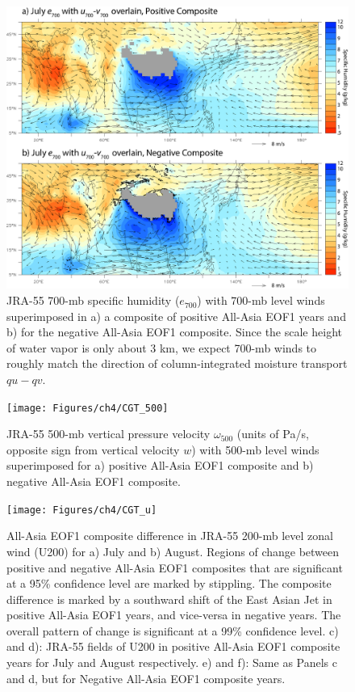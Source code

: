 \begin{figure}
\centering
\noindent\includegraphics[width=36pc]{Figures/ch4/CGT_700}
\caption{JRA-55 700-mb specific humidity ($e_{700}$) with 700-mb level winds superimposed in a) a composite of positive All-Asia EOF1 years and b) for the negative All-Asia EOF1 composite. Since the scale height of water vapor is only about 3 km, we expect 700-mb winds to roughly match the direction of column-integrated moisture transport $qu-qv$.}\label{fig:cgt_700}
\end{figure}

\begin{figure}
\centering
\noindent\texttt{[image: Figures/ch4/CGT\_500]}
\caption{JRA-55 500-mb vertical pressure velocity $\omega_{500}$ (units of Pa/s, opposite sign from vertical velocity $w$) with 500-mb level winds superimposed for a) positive All-Asia EOF1 composite and b) negative All-Asia EOF1 composite.}
\label{fig:cgt_500}
\end{figure}

\begin{figure}
\centering
\noindent\texttt{[image: Figures/ch4/CGT\_u]}
\caption{All-Asia EOF1 composite difference in JRA-55 200-mb level zonal wind (U200) for a) July and b) August. Regions of change between positive and negative All-Asia EOF1 composites that are significant at a 95\% confidence level are marked by stippling. The composite difference is marked by a southward shift of the East Asian Jet in positive All-Asia EOF1 years, and vice-versa in negative years. The overall pattern of change is significant at a 99\% confidence level. c) and d): JRA-55 fields of U200 in positive All-Asia EOF1 composite years for July and August respectively. e) and f): Same as Panels c and d, but for Negative All-Asia EOF1 composite years.}
\label{fig:cgt_u}
\end{figure}

